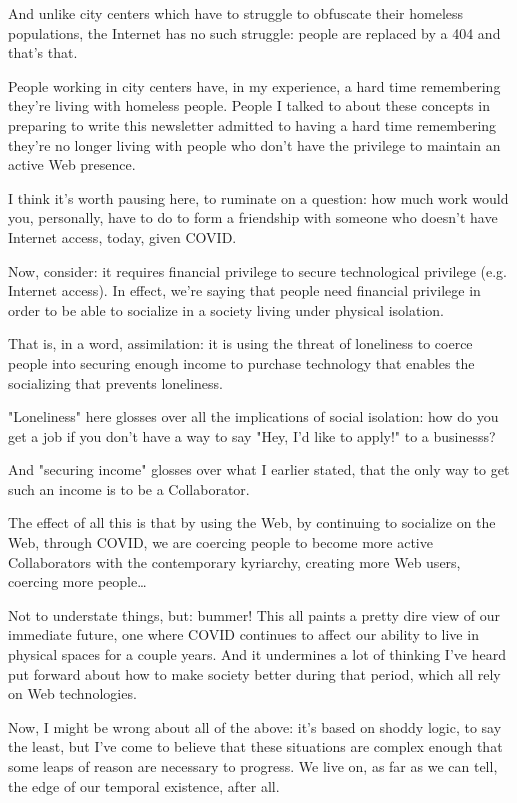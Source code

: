 \documentclass[11pt]{article}
\begin{document}
\begin{itemize}
And unlike city centers which have to struggle to obfuscate their homeless populations, the Internet has no such struggle: people are replaced by a 404 and that's that.

People working in city centers have, in my experience, a hard time remembering they're living with homeless people. People I talked to about these concepts in preparing to write this newsletter admitted to having a hard time remembering they're no longer living with people who don't have the privilege to maintain an active Web presence.

I think it's worth pausing here, to ruminate on a question: how much work would you, personally, have to do to form a friendship with someone who doesn't have Internet access, today, given COVID.

Now, consider: it requires financial privilege to secure technological privilege (e.g. Internet access). In effect, we're saying that people need financial privilege in order to be able to socialize in a society living under physical isolation.

That is, in a word, assimilation: it is using the threat of loneliness to coerce people into securing enough income to purchase technology that enables the socializing that prevents loneliness.

"Loneliness" here glosses over all the implications of social isolation: how do you get a job if you don't have a way to say "Hey, I'd like to apply!" to a businesss?

And "securing income" glosses over what I earlier stated, that the only way to get such an income is to be a Collaborator.

The effect of all this is that by using the Web, by continuing to socialize on the Web, through COVID, we are coercing people to become more active Collaborators with the contemporary kyriarchy, creating more Web users, coercing more people\ldots{}

Not to understate things, but: bummer! This all paints a pretty dire view of our immediate future, one where COVID continues to affect our ability to live in physical spaces for a couple years. And it undermines a lot of thinking I've heard put forward about how to make society better during that period, which all rely on Web technologies.

Now, I might be wrong about all of the above: it's based on shoddy logic, to say the least, but I've come to believe that these situations are complex enough that some leaps of reason are necessary to progress. We live on, as far as we can tell, the edge of our temporal existence, after all.


\end{itemize}
\end{document}
